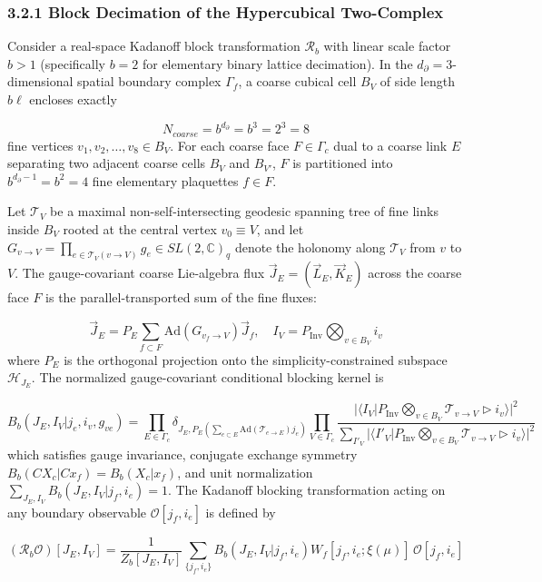 \documentclass[aps,prd,onecolumn,superscriptaddress,nofootinbib,longbibliography,10pt]{revtex4-2}
\begin{document}
  
\subsubsection*{3.2.1 Block Decimation of the Hypercubical Two-Complex}

  Consider a real-space Kadanoff block transformation \(\mathcal{R}_b\) with linear scale factor \(b > 1\) (specifically \(b = 2\) for elementary binary lattice decimation). In the \(d_\partial = 3\)-dimensional spatial boundary complex \(\Gamma_f\), a coarse cubical cell \(B_V\) of side length \(b\ell\) encloses exactly


  \[ N_{coarse} = b^{d_\partial} = b^3 = 2^3 = 8 \]
  fine vertices \(v_1, v_2, \dots, v_8 \in B_V\). For each coarse face \(F \in \Gamma_c\) dual to a coarse link \(E\) separating two adjacent coarse cells \(B_V\) and \(B_{V'}\), \(F\) is partitioned into \(b^{d_\partial - 1} = b^2 = 4\) fine elementary plaquettes \(f \in F\).


  Let \(\mathcal{T}_V\) be a maximal non-self-intersecting geodesic spanning tree of fine links inside \(B_V\) rooted at the central vertex \(v_0 \equiv V\), and let \(G_{v\to V} = \prod_{e\in\mathcal{T}_V(v\to V)} g_e \in SL(2,\mathbb{C})_q\) denote the holonomy along \(\mathcal{T}_V\) from \(v\) to \(V\). The gauge-covariant coarse Lie-algebra flux \(\vec{J}_E = (\vec{L}_E, \vec{K}_E)\) across the coarse face \(F\) is the parallel-transported sum of the fine fluxes:


  \[ \vec{J}_E = P_E \sum_{f\subset F} \text{Ad}\left(G_{v_f\to V}\right)\vec{J}_f, \quad I_V = P_{\text{Inv}} \bigotimes_{v\in B_V} i_v \]
  where \(P_E\) is the orthogonal projection onto the simplicity-constrained subspace \(\mathcal{H}_{J_E}\). The normalized gauge-covariant conditional blocking kernel is


  \[ B_b(J_E, I_V | j_e, i_v, g_{ve}) = \prod_{E\in\Gamma_c} \delta_{J_E, P_E(\sum_{e\subset E}\text{Ad}(\mathcal{T}_{e\to E})j_e)} \prod_{V\in\Gamma_c} \frac{|\langle I_V | P_{\text{Inv}}\bigotimes_{v\in B_V} \mathcal{T}_{v\to V} \triangleright i_v \rangle|^2}{\sum_{I'_V} |\langle I'_V | P_{\text{Inv}}\bigotimes_{v\in B_V} \mathcal{T}_{v\to V} \triangleright i_v \rangle|^2} \]
  which satisfies gauge invariance, conjugate exchange symmetry \(B_b(CX_c|Cx_f) = B_b(X_c|x_f)\), and unit normalization \(\sum_{J_E, I_V} B_b(J_E, I_V | j_f, i_e) = 1\). The Kadanoff blocking transformation acting on any boundary observable \(\mathcal{O}[j_f, i_e]\) is defined by


  \[ (\mathcal{R}_b\mathcal{O})[J_E, I_V] = \frac{1}{Z_b[J_E, I_V]}\sum_{\{j_f, i_e\}} B_b(J_E, I_V | j_f, i_e) W_f[j_f, i_e; \xi(\mu)]\,\mathcal{O}[j_f, i_e] \]
\end{document}
